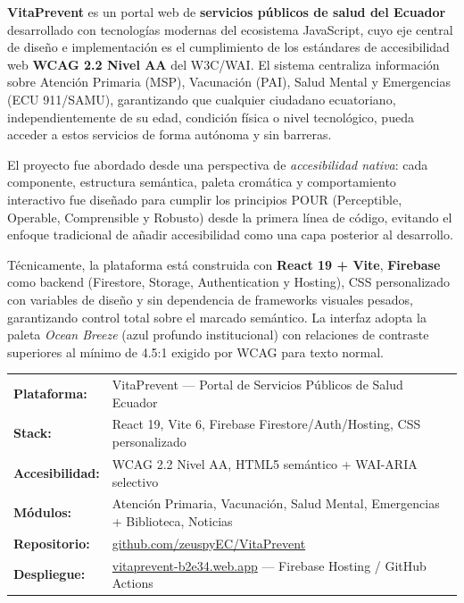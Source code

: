 \documentclass[12pt, a4paper]{report}
\begin{document}
\textbf{VitaPrevent} es un portal web de \textbf{servicios públicos de salud del Ecuador} desarrollado con tecnologías modernas del ecosistema JavaScript, cuyo eje central de diseño e implementación es el cumplimiento de los estándares de accesibilidad web \textbf{WCAG 2.2 Nivel AA} del W3C/WAI. El sistema centraliza información sobre Atención Primaria (MSP), Vacunación (PAI), Salud Mental y Emergencias (ECU 911/SAMU), garantizando que cualquier ciudadano ecuatoriano, independientemente de su edad, condición física o nivel tecnológico, pueda acceder a estos servicios de forma autónoma y sin barreras.

El proyecto fue abordado desde una perspectiva de \textit{accesibilidad nativa}: cada componente, estructura semántica, paleta cromática y comportamiento interactivo fue diseñado para cumplir los principios POUR (Perceptible, Operable, Comprensible y Robusto) desde la primera línea de código, evitando el enfoque tradicional de añadir accesibilidad como una capa posterior al desarrollo.

Técnicamente, la plataforma está construida con \textbf{React 19 + Vite}, \textbf{Firebase} como backend (Firestore, Storage, Authentication y Hosting), CSS personalizado con variables de diseño y sin dependencia de frameworks visuales pesados, garantizando control total sobre el marcado semántico. La interfaz adopta la paleta \textit{Ocean Breeze} (azul profundo institucional) con relaciones de contraste superiores al mínimo de 4.5:1 exigido por WCAG para texto normal.

\bigskip
\begin{infobox}
\begin{tabular}{@{}ll@{}}
\textbf{Plataforma:}    & VitaPrevent --- Portal de Servicios Públicos de Salud Ecuador \\
\textbf{Stack:}         & React 19, Vite 6, Firebase Firestore/Auth/Hosting, CSS personalizado \\
\textbf{Accesibilidad:} & WCAG 2.2 Nivel AA, HTML5 semántico + WAI-ARIA selectivo \\
\textbf{Módulos:}       & Atención Primaria, Vacunación, Salud Mental, Emergencias + Biblioteca, Noticias \\
\textbf{Repositorio:}   & \href{https://github.com/zeuspyEC/VitaPrevent}{github.com/zeuspyEC/VitaPrevent} \\
\textbf{Despliegue:}    & \href{https://vitaprevent-b2e34.web.app}{vitaprevent-b2e34.web.app} --- Firebase Hosting / GitHub Actions \\
\end{tabular}
\end{infobox}
\end{document}
